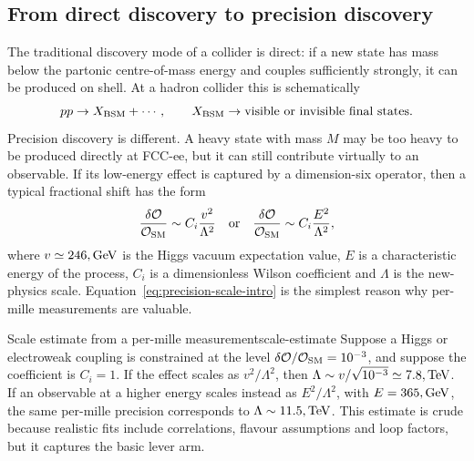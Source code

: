 \documentclass[11pt,a4paper]{article}
\newcommand{\GeV}{\mathrm{GeV}}
\newcommand{\TeV}{\mathrm{TeV}}
\numberwithin{equation}{section}
\begin{document}
\subsection{From direct discovery to precision discovery}
The traditional discovery mode of a collider is direct: if a new state has mass below the partonic centre-of-mass energy and couples sufficiently strongly, it can be produced on shell. At a hadron collider this is schematically
\begin{equation}
  pp \to X_{\rm BSM} + \cdots,
  \qquad
  X_{\rm BSM} \to \text{visible or invisible final states} .
\end{equation}
Precision discovery is different. A heavy state with mass \(M\) may be too heavy to be produced directly at FCC-ee, but it can still contribute virtually to an observable. If its low-energy effect is captured by a dimension-six operator, then a typical fractional shift has the form
\begin{equation}
  \frac{\delta \mathcal O}{\mathcal O_{\rm SM}}
  \sim C_i\frac{v^2}{\Lambda^2}
  \quad \text{or} \quad
  \frac{\delta \mathcal O}{\mathcal O_{\rm SM}}
  \sim C_i\frac{E^2}{\Lambda^2},
  \label{eq:precision-scale-intro}
\end{equation}
where \(v\simeq246\\,\GeV\) is the Higgs vacuum expectation value, \(E\) is a characteristic energy of the process, \(C_i\) is a dimensionless Wilson coefficient and \(\Lambda\) is the new-physics scale. Equation~\eqref{eq:precision-scale-intro} is the simplest reason why per-mille measurements are valuable.

\begin{examplebox}{Scale estimate from a per-mille measurement}{scale-estimate}
Suppose a Higgs or electroweak coupling is constrained at the level \(\delta\mathcal O/\mathcal O_{\rm SM}=10^{-3}\), and suppose the coefficient is \(C_i=1\). If the effect scales as \(v^2/\Lambda^2\), then \(\Lambda\sim v/\sqrt{10^{-3}}\simeq7.8\\,\TeV\). If an observable at a higher energy scales instead as \(E^2/\Lambda^2\), with \(E=365\\,\GeV\), the same per-mille precision corresponds to \(\Lambda\sim11.5\\,\TeV\). This estimate is crude because realistic fits include correlations, flavour assumptions and loop factors, but it captures the basic lever arm.
\end{examplebox}
\end{document}
